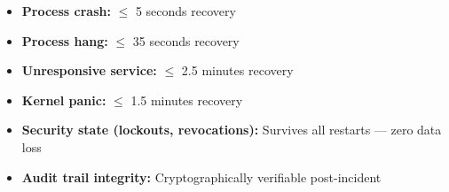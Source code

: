 \documentclass[11pt,a4paper]{article}
\begin{document}
\begin{tcolorbox}[colback=recoveryblue!5, colframe=recoveryblue, title=\textbf{Maximum Downtime Guarantee}]
\begin{itemize}[nosep]
  \item \textbf{Process crash:} $\leq$ 5 seconds recovery
  \item \textbf{Process hang:} $\leq$ 35 seconds recovery
  \item \textbf{Unresponsive service:} $\leq$ 2.5 minutes recovery
  \item \textbf{Kernel panic:} $\leq$ 1.5 minutes recovery
  \item \textbf{Security state (lockouts, revocations):} Survives all restarts — zero data loss
  \item \textbf{Audit trail integrity:} Cryptographically verifiable post-incident
\end{itemize}
\end{tcolorbox}
\end{document}
